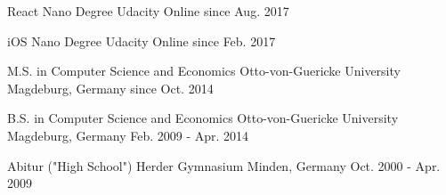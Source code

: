 

\begin{cventries}

     
   \cventry
    {React Nano Degree} %
    {Udacity} %
    {Online} %
    {since Aug. 2017} %
    {
      \begin{cvitems} %
      \end{cvitems}
    }

   \cventry
    {iOS Nano Degree} %
    {Udacity} %
    {Online} %
    {since Feb. 2017} %
    {
      \begin{cvitems} %
      \end{cvitems}
    }
    
   \cventry
    {M.S. in Computer Science and Economics} %
    {Otto-von-Guericke University} %
    {Magdeburg, Germany} %
    {since Oct. 2014} %
    {
      \begin{cvitems} %
      \end{cvitems}
    }
    
   \cventry
    {B.S. in Computer Science and Economics} %
    {Otto-von-Guericke University} %
    {Magdeburg, Germany} %
    {Feb. 2009 - Apr. 2014} %
    {
      \begin{cvitems} %
      \end{cvitems}
    }
    
   \cventry
   {Abitur ("High School") } %
   {Herder Gymnasium} %
   {Minden, Germany} %
   {Oct. 2000 - Apr. 2009}
   {
      \begin{cvitems} %
      \end{cvitems}
   }

     
\end{cventries}
